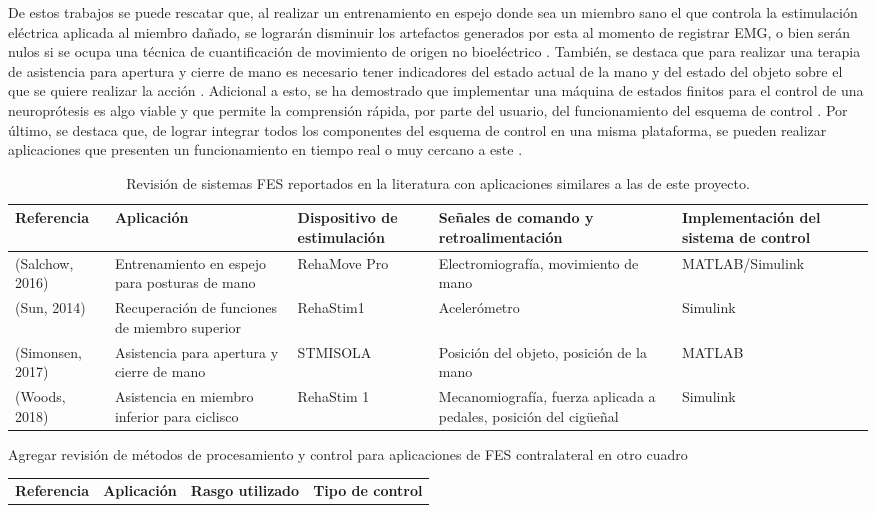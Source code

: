 De estos trabajos se puede rescatar que, al realizar un entrenamiento en espejo donde sea un miembro sano el que controla la estimulación eléctrica aplicada al miembro dañado, se lograrán disminuir los artefactos generados por esta al momento de registrar EMG, o bien serán nulos si se ocupa una técnica de cuantificación de movimiento de origen no bioeléctrico \cite{Salchow2016}. También, se destaca que para realizar una terapia de asistencia para apertura y cierre de mano es necesario tener indicadores del estado actual de la mano y del estado del objeto sobre el que se quiere realizar la acción \cite{Simonsen2017}. Adicional a esto, se ha demostrado que implementar una máquina de estados finitos para el control de una neuroprótesis es algo viable y que permite la comprensión rápida, por parte del usuario, del funcionamiento del esquema de control \cite{Sun2014}. Por último, se destaca que, de lograr integrar todos los componentes del esquema de control en una misma plataforma, se pueden realizar aplicaciones que presenten un funcionamiento en tiempo real o muy cercano a este \cite{Salchow2016}\cite{Sun2014}\cite{Woods2018}.

\begin{table}[hbt]
	\centering
	\begin{tabular}{|p{25mm}|p{35mm}|p{25mm}|p{40mm}|p{35mm}|}
	\hline
	\textbf{Referencia} & \textbf{Aplicación} & \textbf{Dispositivo de estimulación} & \textbf{Señales de comando y retroalimentación} & \textbf{Implementación del sistema de control}\\ 
	\hline
	(Salchow, 2016) & Entrenamiento en espejo para posturas de mano & RehaMove Pro & Electromiografía, movimiento de mano & MATLAB/Simulink\\
	\hline
	(Sun, 2014) & Recuperación de funciones de miembro superior & RehaStim1 & Acelerómetro & Simulink\\
	\hline
	(Simonsen, 2017) & Asistencia para apertura y cierre de mano & STMISOLA & Posición del objeto, posición de la mano & MATLAB\\
	\hline
	(Woods, 2018) & Asistencia en miembro inferior para ciclisco & RehaStim 1 & Mecanomiografía, fuerza aplicada a pedales, posición del cigüeñal & Simulink\\
	\hline
	\end{tabular}
	\centering
	\caption{Revisión de sistemas FES reportados en la literatura con aplicaciones similares a las de este proyecto.}
	\label{Cuadro:Sistemas FES}
\end{table}

{\color{red}Agregar revisión de métodos de procesamiento y control para aplicaciones de FES contralateral en otro cuadro}

\begin{table}[htb]
	\centering
	\begin{tabular}{|c|c|c|c|}
	\hline
	\textbf{Referencia} & \textbf{Aplicación} & \textbf{Rasgo utilizado} & \textbf{Tipo de control}
		
	
	
	\end{tabular}
\end{table}